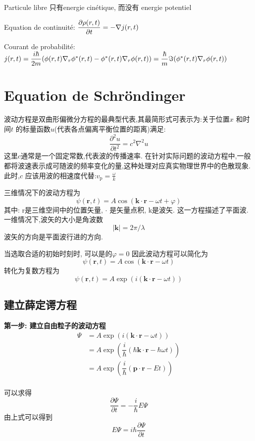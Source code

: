 \documentclass{article}
\begin{document}
Particule libre 只有energie cin\'etique, 而没有 energie potentiel

Equation de continuit\'e: $\dfrac{\partial \rho(r,t)}{\partial t} = - \nabla j(r,t)$

Courant de probabilit\'e: $j(r,t) = \dfrac{i\hbar}{2m} (\phi(r,t) \nabla _r{\phi^*(r,t)} - \phi^*(r,t) \nabla _r{\phi(r,t)}) = \dfrac{\hbar}{m} \Im{(\phi^*(r,t) \nabla _r{\phi(r,t)})} $

\section{Equation de Schr\"ondinger}
波动方程是双曲形偏微分方程的最典型代表,其最简形式可表示为:关于位置$x$ 和时间$t$ 的标量函数$u$(代表各点偏离平衡位置的距离)满足:
$$ \dfrac{\partial^2 u}{\partial t^2} = c^2 \nabla^2u $$
这里$c$通常是一个固定常数,代表波的传播速率.
在针对实际问题的波动方程中,一般都将波速表示成可随波的频率变化的量,这种处理对应真实物理世界中的色散现象.此时,$ c$  应该用波的相速度代替:$v_\mathrm{p} = \frac{\omega}{k}$

三维情况下的波动方程为
$$ \psi \left({\mathbf r}, t \right) = A \cos \left({\mathbf k} \cdot {\mathbf r} - \omega t + \varphi \right) $$
其中:
r是三维空间中的位置矢量,
$\cdot$ 是矢量点积,
k是波矢.
这一方程描述了平面波.一维情况下,波矢的大小是角波数
$$|{\mathbf k}| = 2\pi/\lambda$$
波矢的方向是平面波行进的方向.

当选取合适的初始时刻时, 可以是的$\varphi = 0$
因此波动方程可以简化为
$$ \psi \left({\mathbf r}, t \right) = A \cos \left({\mathbf k} \cdot {\mathbf r} - \omega t \right) $$
转化为复数方程为
$$ \psi \left({\mathbf r}, t \right) = A \exp (i ({\mathbf k} \cdot {\mathbf r} - \omega t)) $$

\subsection{建立薛定谔方程}
\textbf{第一步: 建立自由粒子的波动方程}
$$
\begin{aligned}
\Psi 
& = A \exp (i ({\mathbf k} \cdot {\mathbf r} - \omega t)) \\
& = A \exp (\dfrac{i}{\hbar} (\hbar {\mathbf k} \cdot {\mathbf r} - \hbar \omega t)) \\
& = A \exp (\dfrac{i}{\hbar} ({\mathbf p} \cdot {\mathbf r} - E t)) \\
\end{aligned}
$$

可以求得
$$ \dfrac{\partial \Psi}{\partial t} = - \dfrac{i}{\hbar} E \Psi $$
由上式可以得到
$$E \Psi = i \hbar \dfrac{\partial \Psi}{\partial t}$$
\end{document}
